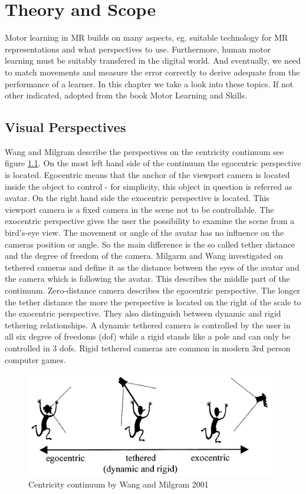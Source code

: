 \chapter{Theory and Scope}

Motor learning in MR builds on many aspects, eg. suitable technology for MR representations and what perspectives to use. Furthermore, human motor learning must be suitably transfered in the digital world. And eventually, we need to match movements and measure the error correctly to derive adequate from the performance of a learner. In this chapter we take a look into these topics. If not other indicated, adopted from the book Motor Learning and Skills\cite{Schmidt2011}.

\section{Visual Perspectives}
Wang and Milgram \cite{Wang2001} describe the perspectives on the centricity continuum see figure \ref{fig:ego-exo-cont}. On the most left hand side of the continuum the egocentric perspective is located. Egocentric means that the anchor of the viewport camera is located inside the object to control - for simplicity, this object in question is referred as avatar. On the right hand side the exocentric perspective is located. This viewport camera is a fixed camera in the scene not to be controllable. The exocentric perspective gives the user the possibility to examine the scene from a bird's-eye view. The movement or angle of the avatar has no influence on the cameras position or angle. So the main difference is the so called tether distance and the degree of freedom of the camera. Milgarm and Wang investigated on tethered cameras and define it as the distance between the eyes of the avatar and the camera which is following the avatar. This describes the middle part of the continuum. Zero-distance camera describes the egocentric perspective. The longer the tether distance the more the perspective is located on the right of the scale to the exocentric perspective. They also distinguish between dynamic and rigid tethering relationships. A dynamic tethered camera is controlled by the user in all six degree of freedoms (dof) while a rigid stands like a pole and can only be controlled in 3 dofs. Rigid tethered cameras are common in modern 3rd person computer games.
\begin{figure}
	\centering
	\includegraphics[width=1.0\textwidth]{img/ego_exo_continuum_bigger.PNG}
	\caption{Centricity continuum by Wang and Milgram 2001 \cite{Wang2001}}
	\label{fig:ego-exo-cont}
\end{figure}

